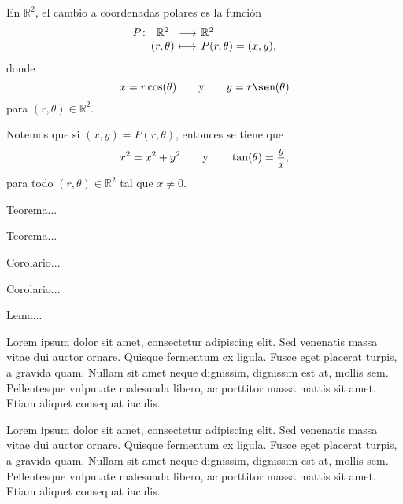 \documentclass[a4]{aleph-notas}
\begin{document}
\encabezado

\begin{defi}
    En $\mathbb{R}^2$, el cambio a coordenadas polares es la función
    \[
        \funcion{P}{\mathbb{R}^2}{\mathbb{R}^2}
        {(r,\theta)}{P(r , \theta)=(x,y),}
    \]
    donde
    \[
        x= r\cos(\theta)
        \texty
        y= r\sen(\theta)
    \]
    para $(r,\theta)\in \mathbb{R}^2$.
\end{defi}

\begin{advertencia}
    Notemos que si $(x,y)=P(r,\theta)$, entonces se tiene que
    \[
        r^2=x^2+y^2
        \qquad\text{y}\qquad
        \tan(\theta)=\frac y x,
    \]  
    para todo $(r,\theta)\in\mathbb{R}^2$ tal que $x\neq 0$.
\end{advertencia}

\begin{teo}
    Teorema...
\end{teo}

\begin{teo}
    Teorema...
\end{teo}

\begin{cor}
    Corolario...
\end{cor}

\begin{cor}[Título]
    Corolario...
\end{cor}

\begin{lem}
    Lema...
\end{lem}

\begin{obs}
    Lorem ipsum dolor sit amet, consectetur adipiscing elit. Sed venenatis massa vitae dui auctor ornare. Quisque fermentum ex ligula. Fusce eget placerat turpis, a gravida quam. Nullam sit amet neque dignissim, dignissim est at, mollis sem. Pellentesque vulputate malesuada libero, ac porttitor massa mattis sit amet. Etiam aliquet consequat iaculis.
\end{obs}

\begin{ejem}
    Lorem ipsum dolor sit amet, consectetur adipiscing elit. Sed venenatis massa vitae dui auctor ornare. Quisque fermentum ex ligula. Fusce eget placerat turpis, a gravida quam. Nullam sit amet neque dignissim, dignissim est at, mollis sem. Pellentesque vulputate malesuada libero, ac porttitor massa mattis sit amet. Etiam aliquet consequat iaculis.
\end{ejem}
\end{document}

